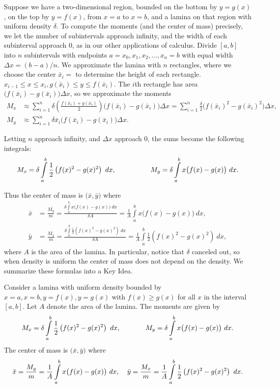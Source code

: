 Suppose we have a two-dimensional region, bounded on the bottom by $y=g(x)$, on the top by $y=f(x)$, from $x=a$ to $x=b$, and a lamina on that region with uniform density $\delta$.
To compute the moments (and the center of mass) precisely, we let the number of subintervals approach infinity, and the width of each subinterval approach 0, as in our other applications of calculus.  Divide $[a,b]$ into $n$ subintervals with endpoints $a=x_0, x_1, x_2, \dots, x_n = b$ with equal width $\Delta x = (b-a)/n$.
We approximate the lamina with $n$ rectangles, where we choose the center $\bar{x}_i=$  to determine the height of each rectangle.  $x_{i-1} \leq x \leq x_i, g(\bar{x}_i) \leq y \leq f(\bar{x}_i)$.
The $i$th rectangle has area $\big( f(\bar{x}_i) - g(\bar{x}_i) \big) \Delta x$, so we approximate the moments
\begin{align*}
M_x &\approx \sum\limits_{i=1}^n \delta \left( \frac{f(\bar{x}_i) + g(\bar{x}_i)}{2}\right) \big( f(\bar{x}_i) - g(\bar{x}_i) \big) \Delta x = \sum\limits_{i=1}^n \frac{\delta}{2} \big( f(\bar{x}_i)^2 - g(\bar{x}_i)^2 \big) \Delta x,  \\
M_y &\approx \sum\limits_{i=1}^n \delta \bar{x}_i \big( f(\bar{x}_i) - g(\bar{x}_i) \big) \Delta x.
\end{align*}

Letting $n$ approach infinity, and $\Delta x$ approach 0, the sums become the following integrals:
$$
M_x = \delta \int\limits_a^b \frac{1}{2}\left(f(x)^2 - g(x)^2 \right)\ dx, \hspace{0.7 in} M_y = \delta \int\limits_a^b x\big(f(x)-g(x)\big)\ dx.
$$

Thus the center of mass is $\big(\bar{x}, \bar{y} \big)$ where
\begin{align*}
\bar{x} &= \frac{M_y}{m} = \frac{\delta \int\limits_a^b x\big(f(x)-g(x)\big)\ dx}{\delta A} = \frac{1}{A} \int\limits_a^b x\big(f(x)-g(x)\big)\ dx,\\
\bar{y} &= \frac{M_x}{m} = \frac{\delta \int\limits_a^b \frac{1}{2}\left(f(x)^2 - g(x)^2 \right)\ dx}{\delta A} = \frac{1}{A} \int\limits_a^b \frac{1}{2}\left(f(x)^2 - g(x)^2 \right)\ dx,
\end{align*}
where $A$ is the area of the lamina.  In particular, notice that $\delta$ canceled out, so when density is uniform the center of mass does not depend on the density.  We summarize these formulas into a Key Idea.

{Consider a lamina with uniform density bounded by $x=a, x=b, y=f(x), y=g(x)$ with $f(x)\geq g(x)$ for all $x$ in the interval $[a,b]$.
Let $A$ denote the area of the lamina.  The moments are given by
$$
M_x = \delta \int\limits_a^b \frac{1}{2}\left(f(x)^2 - g(x)^2 \right)\ dx, \hspace{0.5 in} M_y = \delta \int\limits_a^b x\big(f(x)-g(x)\big)\ dx.
$$
The center of mass is $\big(\bar{x}, \bar{y} \big)$ where
$$
\bar{x} = \frac{M_y}{m} = \frac{1}{A} \int\limits_a^b x\big(f(x)-g(x)\big)\ dx, \hspace{0.15 in}
\bar{y} = \frac{M_x}{m} = \frac{1}{A} \int\limits_a^b \frac{1}{2}\left(f(x)^2 - g(x)^2 \right)\ dx.
$$
}

